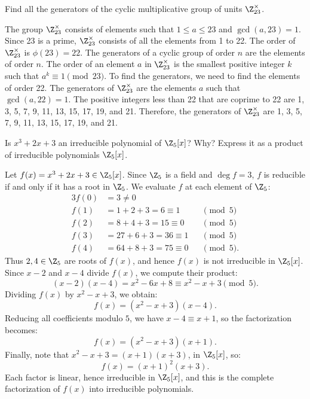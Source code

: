 \begin{problem}[28.8]
  Find all the generators of the cyclic multiplicative group of units $\Z_{23}^\times$.
\end{problem}

\begin{solution}
  The group $\Z_{23}^\times$ consists of elements such that $1 \le a \le 23$ and $\gcd(a, 23) = 1$. Since 23 is a prime, $\Z_{23}^\times$ consists of all the elements from 1 to 22. The order of $\Z_{23}^\times$ is $\phi(23) = 22$. The generators of a cyclic group of order $n$ are the elements of order $n$. The order of an element $a$ in $\Z_{23}^\times$ is the smallest positive integer $k$ such that $a^k \equiv 1 \pmod{23}$. To find the generators, we need to find the elements of order 22. The generators of $\Z_{23}^\times$ are the elements $a$ such that $\gcd(a, 22) = 1$. The positive integers less than 22 that are coprime to 22 are 1, 3, 5, 7, 9, 11, 13, 15, 17, 19, and 21. Therefore, the generators of $\Z_{23}^\times$ are 1, 3, 5, 7, 9, 11, 13, 15, 17, 19, and 21.
\end{solution}

\begin{problem}[28.12]
  Is $x^3 + 2x + 3$ an irreducible polynomial of $\Z_5[x]$? Why? Express it as a product of irreducible polynomials $\Z_5[x]$.
\end{problem}

\begin{solution}
  Let $f(x) = x^3 + 2x + 3 \in \Z_5[x]$. Since $\Z_5$ is a field and $\deg f = 3$, $f$ is reducible if and only if it has a root in $\Z_5$. We evaluate $f$ at each element of $\Z_5$:
  \begin{alignat*}{3}
    f(0) &= 3 \neq 0 \\
    f(1) &= 1 + 2 + 3 = 6 \equiv 1 &&\pmod{5} \\
    f(2) &= 8 + 4 + 3 = 15 \equiv 0 &&\pmod{5} \\
    f(3) &= 27 + 6 + 3 = 36 \equiv 1 &&\pmod{5} \\
    f(4) &= 64 + 8 + 3 = 75 \equiv 0 &&\pmod{5}
  .\end{alignat*}
  Thus $2, 4 \in \Z_5$ are roots of $f(x)$, and hence $f(x)$ is not irreducible in $\Z_5[x]$. Since $x - 2$ and $x - 4$ divide $f(x)$, we compute their product:
  \[%
    (x - 2)(x - 4) = x^2 - 6x + 8 \equiv x^2 - x + 3 \pmod{5}
  .\]%
  Dividing $f(x)$ by $x^2 - x + 3$, we obtain:
  \[%
    f(x) = (x^2 - x + 3)(x - 4)
  .\]%
  Reducing all coefficients modulo $5$, we have $x - 4 \equiv x + 1$, so the factorization becomes:
  \[%
    f(x) = (x^2 - x + 3)(x + 1)
  .\]%
  Finally, note that $x^2 - x + 3 = (x + 1)(x + 3)$, in $\Z_5[x]$, so:
  \[%
    f(x) = (x + 1)^2 (x + 3)
  .\]%
  Each factor is linear, hence irreducible in $\Z_5[x]$, and this is the complete factorization of $f(x)$ into irreducible polynomials.
\end{solution}

